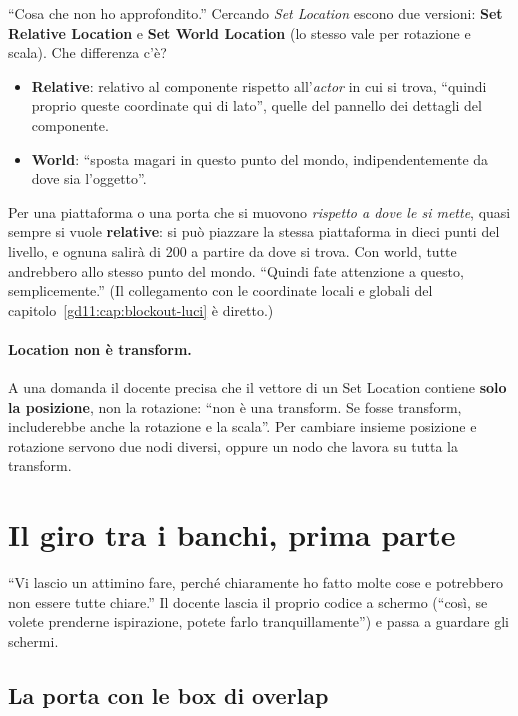 ``Cosa che non ho approfondito.'' Cercando \emph{Set Location} escono due
versioni: \textbf{Set Relative Location} e \textbf{Set World Location} (lo
stesso vale per rotazione e scala). Che differenza c'è?
\begin{itemize}
  \item \textbf{Relative}: relativo al componente rispetto all'\emph{actor} in
        cui si trova, ``quindi proprio queste coordinate qui di lato'', quelle
        del pannello dei dettagli del componente.
  \item \textbf{World}: ``sposta magari in questo punto del mondo,
        indipendentemente da dove sia l'oggetto''.
\end{itemize}
Per una piattaforma o una porta che si muovono \emph{rispetto a dove le si
mette}, quasi sempre si vuole \textbf{relative}: si può piazzare la stessa
piattaforma in dieci punti del livello, e ognuna salirà di 200 a partire da dove
si trova. Con world, tutte andrebbero allo stesso punto del mondo. ``Quindi fate
attenzione a questo, semplicemente.'' (Il collegamento con le coordinate locali
e globali del capitolo~\ref{gd11:cap:blockout-luci} è diretto.)

\paragraph{Location non è transform.} A una domanda il docente precisa che il
vettore di un Set Location contiene \textbf{solo la posizione}, non la
rotazione: ``non è una transform. Se fosse transform, includerebbe anche la
rotazione e la scala''. Per cambiare insieme posizione e rotazione servono due
nodi diversi, oppure un nodo che lavora su tutta la transform.

\section{Il giro tra i banchi, prima parte}
\label{gd12:sec:giro1}

``Vi lascio un attimino fare, perché chiaramente ho fatto molte cose e potrebbero
non essere tutte chiare.'' Il docente lascia il proprio codice a schermo
(``così, se volete prenderne ispirazione, potete farlo tranquillamente'') e
passa a guardare gli schermi.

\subsection{La porta con le box di overlap}

